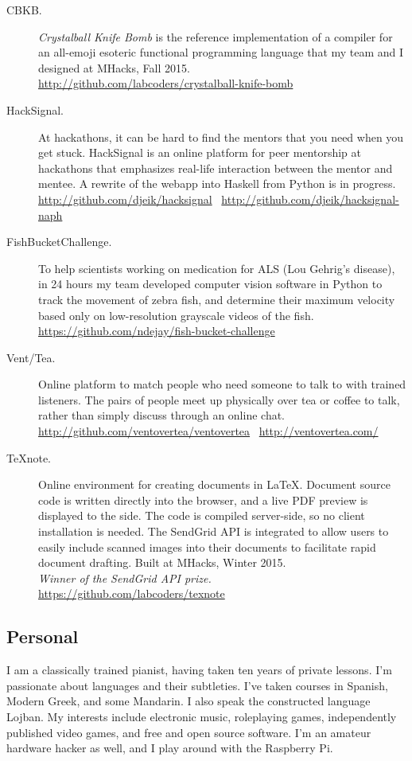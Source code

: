 \documentclass{article}
\begin{document}
\begin{description}
    \item[CBKB.] \emph{Crystalball Knife Bomb} is the reference implementation
        of a compiler for an all-emoji esoteric functional programming language
        that my team and I designed at MHacks, Fall 2015. \\
        \url{http://github.com/labcoders/crystalball-knife-bomb}
    \item[HackSignal.] At hackathons, it can be hard to find the mentors that
        you need when you get stuck. HackSignal is an online platform for peer
        mentorship at hackathons that emphasizes real-life interaction between
        the mentor and mentee. A rewrite of the webapp into Haskell from Python
        is in progress. \\
        \url{http://github.com/djeik/hacksignal}~
        \url{http://github.com/djeik/hacksignal-naph}
    \item[FishBucketChallenge.] To help scientists working on medication for
        ALS (Lou Gehrig's disease), in 24 hours my team developed computer
        vision software in Python to track the movement of zebra fish, and
        determine their maximum velocity based only on low-resolution grayscale
        videos of the fish. \\
        \url{https://github.com/ndejay/fish-bucket-challenge}
    \item[Vent/Tea.] Online platform to match people who need someone to talk
        to with trained listeners. The pairs of people meet up physically over
        tea or coffee to talk, rather than simply discuss through an online
        chat. \\
        \url{http://github.com/ventovertea/ventovertea}~
        \url{http://ventovertea.com/}
    \item[TeXnote.] Online environment for creating documents in \LaTeX.
        Document source code is written directly into the browser, and a live
        PDF preview is displayed to the side. The code is compiled server-side,
        so no client installation is needed. The SendGrid API is integrated to
        allow users to easily include scanned images into their documents to
        facilitate rapid document drafting. Built at MHacks, Winter 2015. \\
        \emph{Winner of the SendGrid API prize.} \\
        \url{https://github.com/labcoders/texnote}
\end{description}

\subsection*{Personal}

I am a classically trained pianist, having taken ten years of private lessons.
I'm passionate about languages and their subtleties. I've taken courses in
Spanish, Modern Greek, and some Mandarin. I also speak the constructed language
Lojban.
My interests include electronic music, roleplaying games, independently
published video games, and free and open source software. I'm an amateur
hardware hacker as well, and I play around with the Raspberry Pi.
\end{document}
